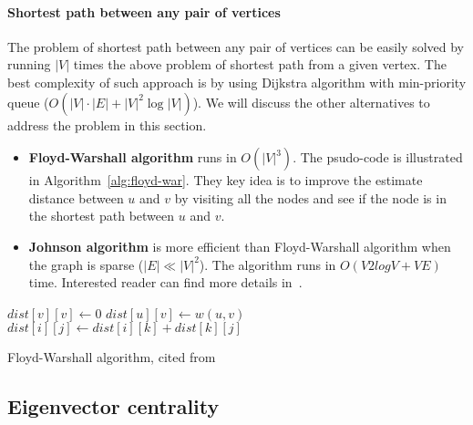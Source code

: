 \paragraph{Shortest path between any pair of vertices}
The problem of shortest path between any pair of vertices can be easily solved by running $|V|$ times the above problem of shortest path from a given vertex. The best complexity of such approach is by using Dijkstra algorithm with min-priority queue ($O(|V|\cdot|E|+|V|^2\log|V|)$). We will discuss the other alternatives to address the problem in this section.
	\begin{itemize}	
		\item {\bf Floyd-Warshall algorithm} runs in $O(|V|^3)$. The psudo-code is illustrated in Algorithm~\ref{alg:floyd-war}. They key idea is to improve the estimate distance between $u$ and $v$ by visiting all the nodes and see if the node is in the shortest path between $u$ and $v$.

	 	\item {\bf Johnson algorithm} is more efficient than Floyd-Warshall algorithm when the graph is sparse ($|E| \ll |V|^2$). The algorithm runs in $O(V2log V + VE)$ time. Interested reader can find more details in~\cite{johnson-alg}.
	\end{itemize}

\begin{algorithm}
	\begin{algorithmic}[1]		
		   \State $dist[v][v] \gets 0$	
		\EndFor
		   \State $dist[u][v] \gets w(u,v)$  
		\EndFor
		            \State $dist[i][j]\gets  dist[i][k] + dist[k][j]$
		        \EndIf
		      \EndFor
		    \EndFor
		\EndFor
	\end{algorithmic}
\caption{Floyd-Warshall algorithm, cited from~\cite{floyd-war-wiki}}
\label{alg:floyd-war}
\end{algorithm}
\subsection{Eigenvector centrality}
